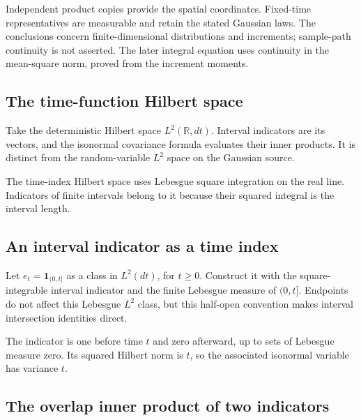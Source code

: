 \documentclass[11pt,a4paper]{report}
\begin{document}
Independent product copies provide the spatial coordinates. Fixed-time representatives are measurable and retain the stated Gaussian laws. The conclusions concern finite-dimensional distributions and increments; sample-path continuity is not asserted. The later integral equation uses continuity in the mean-square norm, proved from the increment moments.

\subsection{\texorpdfstring{The time-function Hilbert space}{The time-function Hilbert space}}
\label{report-step-UnadjustedLangevin-CanonicalBrownian-lean-1}


Take the deterministic Hilbert space \(L^2(\mathbb R,dt)\). Interval indicators are its vectors, and the isonormal covariance formula evaluates their inner products. It is distinct from the random-variable \(L^2\) space on the Gaussian source.



The time-index Hilbert space uses Lebesgue square integration on the real line. Indicators of finite intervals belong to it because their squared integral is the interval length.

\subsection{\texorpdfstring{An interval indicator as a time index}{An interval indicator as a time index}}
\label{report-step-UnadjustedLangevin-CanonicalBrownian-lean-2}


Let \(e_t=\mathbf1_{(0,t]}\) as a class in \(L^2(dt)\), for \(t\ge0\). Construct it with the square-integrable interval indicator and the finite Lebesgue measure of \((0,t]\). Endpoints do not affect this Lebesgue \(L^2\) class, but this half-open convention makes interval intersection identities direct.



The indicator is one before time \(t\) and zero afterward, up to sets of Lebesgue measure zero. Its squared Hilbert norm is \(t\), so the associated isonormal variable has variance \(t\).

\subsection{\texorpdfstring{The overlap inner product of two indicators}{The overlap inner product of two indicators}}
\label{report-step-UnadjustedLangevin-CanonicalBrownian-lean-3}
\end{document}

